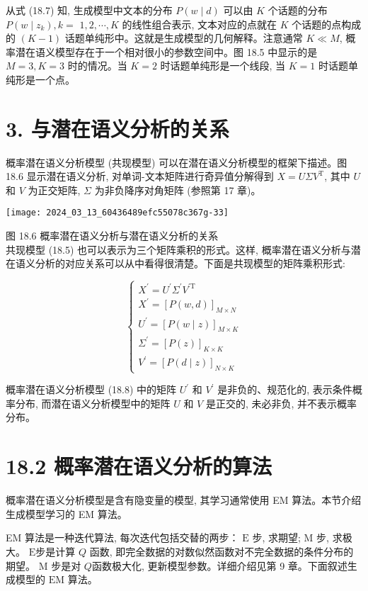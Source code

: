 \documentclass[10pt]{article}
\begin{document}
从式 (18.7) 知, 生成模型中文本的分布 $P(w \mid d)$ 可以由 $K$ 个话题的分布 $P\left(w \mid z_{k}\right), k=$ $1,2, \cdots, K$ 的线性组合表示, 文本对应的点就在 $K$ 个话题的点构成的 $(K-1)$ 话题单纯形中。这就是生成模型的几何解释。注意通常 $K \ll M$, 概率潜在语义模型存在于一个相对很小的参数空间中。图 18.5 中显示的是 $M=3, K=3$ 时的情况。当 $K=2$ 时话题单纯形是一个线段, 当 $K=1$ 时话题单纯形是一个点。

\section*{3. 与潜在语义分析的关系}
概率潜在语义分析模型 (共现模型) 可以在潜在语义分析模型的框架下描述。图 18.6 显示潜在语义分析, 对单词-文本矩阵进行奇异值分解得到 $X=U \Sigma V^{\mathrm{T}}$, 其中 $U$ 和 $V$ 为正交矩阵, $\Sigma$ 为非负降序对角矩阵 (参照第 17 章)。

\begin{center}
\texttt{[image: 2024\_03\_13\_60436489efc55078c367g-33]}
\end{center}

图 18.6 概率潜在语义分析与潜在语义分析的关系\\
共现模型 (18.5) 也可以表示为三个矩阵乘积的形式。这样, 概率潜在语义分析与潜在语义分析的对应关系可以从中看得很清楚。下面是共现模型的矩阵乘积形式:

\[
\left\{\begin{array}{l}
X^{\prime}=U^{\prime} \Sigma^{\prime} V^{\prime \mathrm{T}}  \tag{18.8}\\
X^{\prime}=[P(w, d)]_{M \times N} \\
U^{\prime}=[P(w \mid z)]_{M \times K} \\
\Sigma^{\prime}=[P(z)]_{K \times K} \\
V^{\prime}=[P(d \mid z)]_{N \times K}
\end{array}\right.
\]

概率潜在语义分析模型 (18.8) 中的矩阵 $U^{\prime}$ 和 $V^{\prime}$ 是非负的、规范化的, 表示条件概率分布, 而潜在语义分析模型中的矩阵 $U$ 和 $V$ 是正交的, 未必非负, 并不表示概率分布。

\section*{18.2 概率潜在语义分析的算法}
概率潜在语义分析模型是含有隐变量的模型, 其学习通常使用 EM 算法。本节介绍生成模型学习的 EM 算法。

EM 算法是一种迭代算法, 每次迭代包括交替的两步： $\mathrm{E}$ 步, 求期望; $\mathrm{M}$ 步, 求极大。 $\mathrm{E}$步是计算 $Q$ 函数, 即完全数据的对数似然函数对不完全数据的条件分布的期望。 $\mathrm{M}$ 步是对 $Q$函数极大化, 更新模型参数。详细介绍见第 9 章。下面叙述生成模型的 $\mathrm{EM}$ 算法。
\end{document}
